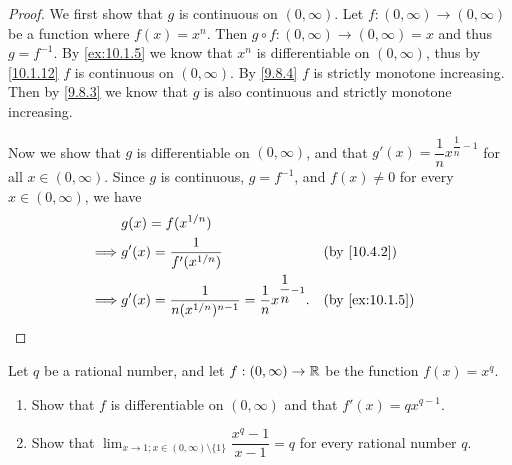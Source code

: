 \begin{proof}
  We first show that \(g\) is continuous on \((0, \infty)\).
  Let \(f : (0, \infty) \to (0, \infty)\) be a function where \(f(x) = x^n\).
  Then \(g \circ f : (0, \infty) \to (0, \infty) = x\) and thus \(g = f^{-1}\).
  By \cref{ex:10.1.5} we know that \(x^n\) is differentiable on \((0, \infty)\), thus by \cref{10.1.12} \(f\) is continuous on \((0, \infty)\).
  By \cref{9.8.4} \(f\) is strictly monotone increasing.
  Then by \cref{9.8.3} we know that \(g\) is also continuous and strictly monotone increasing.

  Now we show that \(g\) is differentiable on \((0, \infty)\), and that \(g'(x) = \dfrac{1}{n} x^{\dfrac{1}{n} - 1}\) for all \(x \in (0, \infty)\).
  Since \(g\) is continuous, \(g = f^{-1}\), and \(f(x) \neq 0\) for every \(x \in (0, \infty)\), we have
  \begin{align*}
             & g(x) = f(x^{1 / n})                                                                               \\
    \implies & g'(x) = \dfrac{1}{f'(x^{1 / n})}                                              &  & \by{10.4.2}    \\
    \implies & g'(x) = \dfrac{1}{n (x^{1 / n})^{n - 1}} = \dfrac{1}{n} x^{\dfrac{1}{n} - 1}. &  & \by{ex:10.1.5}
  \end{align*}
\end{proof}

\begin{ex}\label{ex:10.4.2}
  Let \(q\) be a rational number, and let \(f : (0, \infty) \to \mathbb{R}\) be the function \(f(x) = x^q\).
  \begin{enumerate}
    \item Show that \(f\) is differentiable on \((0, \infty)\) and that \(f'(x) = q x^{q - 1}\).
    \item Show that \(\lim_{x \to 1 ; x \in (0, \infty) \setminus \{1\}} \dfrac{x^q - 1}{x - 1} = q\) for every rational number \(q\).
  \end{enumerate}
\end{ex}

